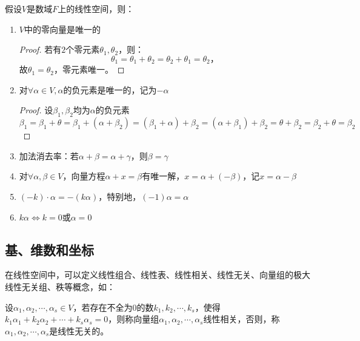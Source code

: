 \begin{property}[线性空间的性质]
    假设$V$是数域$F$上的线性空间，则：
    \begin{enumerate}
        \item $V$中的零向量是唯一的
        \begin{proof}
            若有$2$个零元素$\theta_1, \theta_2$，则：
            \begin{equation}
                \theta_1 = \theta_1 + \theta_2 = \theta_2 + \theta_1 = \theta_2，
            \end{equation}
            故$\theta_1 = \theta_2$，零元素唯一。
        \end{proof}
        
        \item 对$\forall \alpha \in V, \alpha$的负元素是唯一的，记为$-\alpha$
        \begin{proof}
            设$\beta_1, \beta_2$均为$\alpha$的负元素
            \begin{equation}
                \beta_1 = \beta_1 + \theta = \beta_1 + (\alpha + \beta_2) = (\beta_1 + \alpha) + \beta_2 = (\alpha + \beta_1) + \beta_2 = \theta + \beta_2 = \beta_2 + \theta = \beta_2
            \end{equation}
        \end{proof}

        \item 加法消去率：若$\alpha + \beta  = \alpha + \gamma$，则$\beta = \gamma$
        \item 对$\forall \alpha, \beta \in V$，向量方程$\alpha + x = \beta$有唯一解，$x = \alpha + (-\beta)$，记$x = \alpha - \beta$
        \item $(-k) \cdot \alpha = -(k \alpha)$，特别地，$(-1) \alpha = \alpha$
        \item $k \alpha \Leftrightarrow k = 0$或$\alpha =0$
    \end{enumerate}

    \subsection{基、维数和坐标}
    在线性空间中，可以定义线性组合、线性表、线性相关、线性无关、向量组的极大线性无关组、秩等概念，如：
    \begin{definition}
        设$\alpha_1, \alpha_2, \cdots, \alpha_s \in V$，若存在不全为$0$的数$k_1, k_2, \cdots, k_s$，使得$k_1 \alpha_1 + k_2 \alpha_2 + \cdots + k_s \alpha_s = 0$，则称向量组$\alpha_1, \alpha_2, \cdots, \alpha_s$线性相关，否则，称$\alpha_1, \alpha_2, \cdots, \alpha_s$是线性无关的。
    \end{definition}
    

\end{property}
